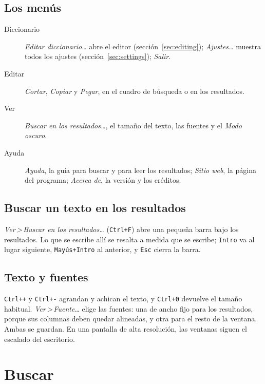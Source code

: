 \documentclass[12pt,
              article,
              oneside
              ]{memoir}
\newcommand*{\menu}[1]{\textit{#1}}
\newcommand*{\then}{\,>\,}
\newcommand*{\key}[1]{\texttt{#1}}
\begin{document}
\subsection{Los menús}

%
\begin{description}
\item[Diccionario] \menu{Editar diccionario\ldots} abre el editor
  (sección~\ref{sec:editing}); \menu{Ajustes\ldots} muestra todos los
  ajustes (sección~\ref{sec:settings}); \menu{Salir}.
\item[Editar] \menu{Cortar}, \menu{Copiar} y \menu{Pegar}, en el cuadro de
  búsqueda o en los resultados.
\item[Ver] \menu{Buscar en los resultados\ldots}, el tamaño del texto, las
  fuentes y el \menu{Modo oscuro}.
\item[Ayuda] \menu{Ayuda}, la guía para buscar y para leer los
  resultados; \menu{Sitio web}, la página del programa; \menu{Acerca de},
  la versión y los créditos.
\end{description}

\subsection{Buscar un texto en los resultados}

%
\menu{Ver\then Buscar en los resultados\ldots} (\key{Ctrl+F}) abre una
pequeña barra bajo los resultados. Lo que se escribe allí se resalta a
medida que se escribe; \key{Intro} va al lugar siguiente,
\key{Mayús+Intro} al anterior, y \key{Esc} cierra la barra.

\subsection{Texto y fuentes}

%
\key{Ctrl++} y \key{Ctrl+-} agrandan y achican el texto, y \key{Ctrl+0}
devuelve el tamaño habitual. \menu{Ver\then Fuente\ldots} elige las
fuentes: una de ancho fijo para los resultados, porque sus columnas deben
quedar alineadas, y otra para el resto de la ventana. Ambas se guardan.
En una pantalla de alta resolución, las ventanas siguen el escalado del
escritorio.

\section{Buscar}
\label{sec:searching}
\end{document}
